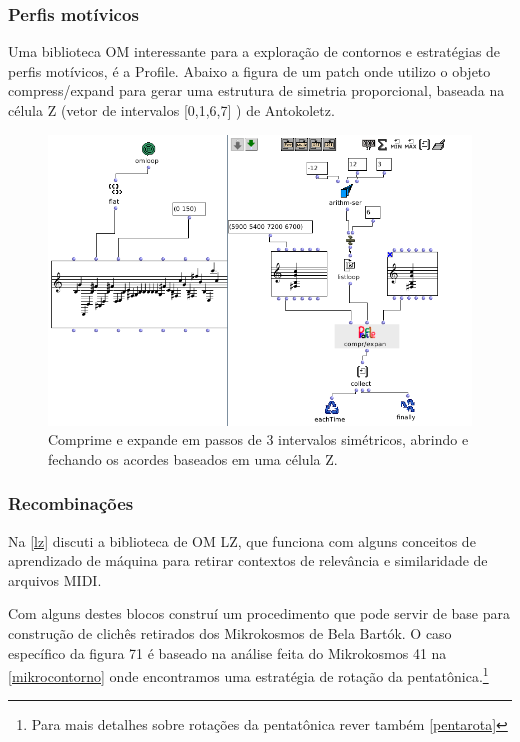 \documentclass[
	12pt,				%
	openright,			%
	twoside,			%
	a4paper,			%
	english,			%
	french,				%
	spanish,			%
	brazil				%
	]{abntex2}
\begin{document}
\subsubsection{Perfis motívicos}
\label{perfis}

Uma biblioteca OM interessante para a exploração de contornos e estratégias de perfis motívicos, é a Profile. Abaixo a figura de um patch onde utilizo o objeto compress/expand para gerar uma estrutura de simetria proporcional, baseada na célula Z (vetor de intervalos [0,1,6,7] ) de Antokoletz. 

\begin{figure}[!h]
	\caption{\label{fig_grafico}Comprime e expande em passos de 3 intervalos simétricos, abrindo e fechando os acordes baseados em uma célula Z. }
	\begin{center}
	    \includegraphics[scale=0.6]{OMPD/Profile_celulaZ.png}
	\end{center}
\end{figure}


\subsubsection{Recombinações }

Na \autoref{lz} discuti a biblioteca de OM LZ, que funciona com alguns conceitos de aprendizado de máquina para retirar contextos de relevância e similaridade de arquivos MIDI.

Com alguns destes blocos construí um procedimento que pode servir de base para construção de clichês retirados dos Mikrokosmos de Bela Bartók. O caso específico da figura 71 é baseado na análise feita do Mikrokosmos 41 na \autoref{mikrocontorno} onde encontramos uma estratégia de rotação da pentatônica.\footnote{Para mais detalhes sobre rotações da pentatônica rever também \autoref{pentarota} }
\end{document}
